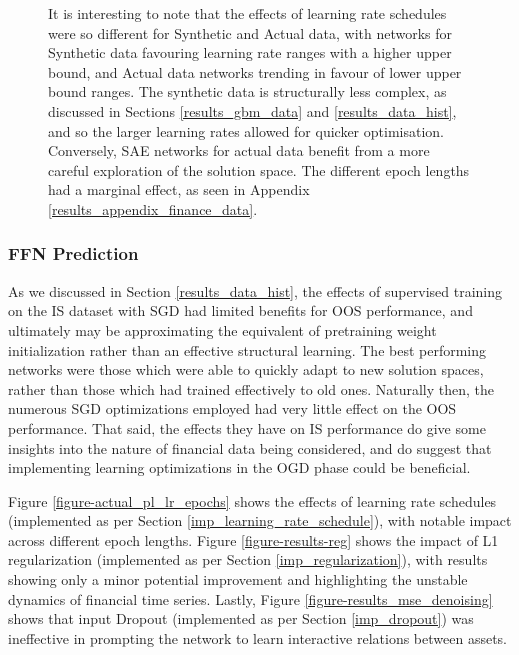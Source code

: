 \documentclass[a4paper,11pt,oneside]{article}
\theoremstyle{plain}
\theoremstyle{definition}
\begin{document}
\begin{figure}[H]
{			\newline It is interesting to note that the effects of learning rate schedules were so different for Synthetic and Actual data, with networks for Synthetic data favouring learning rate ranges with a higher upper bound, and Actual data networks trending in favour of lower upper bound ranges. The synthetic data is structurally less complex, as discussed in Sections \ref{results_gbm_data} and \ref{results_data_hist}, and so the larger learning rates allowed for quicker optimisation. Conversely, SAE networks for actual data benefit from a more careful exploration of the solution space. The different epoch lengths had a marginal effect, as seen in Appendix \ref{results_appendix_finance_data}.}
		\label{figure-mse_lr}
	\end{figure}

	

	

	
	
	
	
	
	
	
	
	\newpage
	\subsubsection{FFN Prediction}
	
	As we discussed in Section \ref{results_data_hist}, the effects of supervised training on the IS dataset with SGD had limited benefits for OOS performance, and ultimately may be approximating the equivalent of pretraining weight initialization rather than an effective structural learning. The best performing networks were those which were able to quickly adapt to new solution spaces, rather than those which had trained effectively to old ones. Naturally then, the numerous SGD optimizations employed had very little effect on the OOS performance. That said, the effects they have on IS performance do give some insights into the nature of financial data being considered, and do suggest that implementing learning optimizations in the OGD phase could be beneficial. \newline
		
	Figure \ref{figure-actual_pl_lr_epochs} shows the effects of learning rate schedules (implemented as per Section \ref{imp_learning_rate_schedule}), with notable impact across different epoch lengths. Figure \ref{figure-results-reg} shows the impact of L1 regularization (implemented as per Section \ref{imp_regularization}), with results showing only a minor potential improvement and highlighting the unstable dynamics of financial time series. Lastly, Figure \ref{figure-results_mse_denoising} shows that input Dropout (implemented as per Section \ref{imp_dropout}) was ineffective in prompting the network to learn interactive relations between assets.
		
\end{document}
